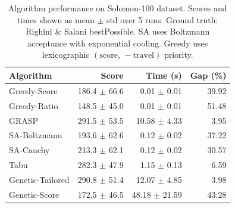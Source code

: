 \begin{table}[htbp]
\centering
\caption{Algorithm performance on Solomon-100 dataset. Scores and times shown as mean $\pm$ std over 5 runs. Ground truth: Righini \& Salani bestPossible. SA uses Boltzmann acceptance with exponential cooling. Greedy uses lexicographic $(\text{score},\,-\text{travel})$ priority.}
\label{tab:results_s100}
\small
\setlength{\tabcolsep}{6pt}
\begin{tabular}{l rrr}
\toprule
\textbf{Algorithm}
& \textbf{Score} & \textbf{Time (s)} & \textbf{Gap (\%)} \\
\midrule
  Greedy-Score & 186.4 $\pm$ 66.6 & 0.01 $\pm$ 0.01 & 39.92 \\
  Greedy-Ratio & 148.5 $\pm$ 45.0 & 0.01 $\pm$ 0.01 & 51.48 \\
  GRASP & 291.5 $\pm$ 53.5 & 10.58 $\pm$ 4.33 & 3.95 \\
  SA-Boltzmann & 193.6 $\pm$ 62.6 & 0.12 $\pm$ 0.02 & 37.22 \\
  SA-Cauchy & 213.3 $\pm$ 62.1 & 0.12 $\pm$ 0.02 & 30.57 \\
  Tabu & 282.3 $\pm$ 47.9 & 1.15 $\pm$ 0.13 & 6.59 \\
  Genetic-Tailored & 290.8 $\pm$ 51.4 & 12.07 $\pm$ 4.85 & 3.98 \\
  Genetic-Score & 172.5 $\pm$ 46.5 & 48.18 $\pm$ 21.59 & 43.28 \\
\bottomrule
\end{tabular}
\end{table}